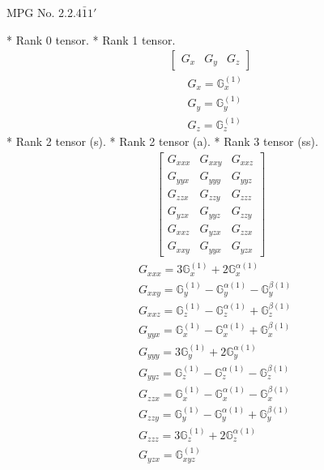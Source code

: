\documentclass[fleqn,8pt,landscape]{jsarticle}
\begin{document}
\setcounter{MaxMatrixCols}{32}

\renewcommand{\tablename}{Table~}
\renewcommand{\figurename}{Figure~}
\begin{center}
\LARGE
MPG No. 2.2.4\quad$\bar{1}1'$
\end{center}
* Rank 0 tensor.
* Rank 1 tensor.
\begin{align*}
\begin{bmatrix} G_{x} & G_{y} & G_{z} \end{bmatrix}
\end{align*}
\begin{align*}
& G_{x} = \mathbb{G}_{x}^{(1)} \\
& G_{y} = \mathbb{G}_{y}^{(1)} \\
& G_{z} = \mathbb{G}_{z}^{(1)}
\end{align*}
* Rank 2 tensor (s).
* Rank 2 tensor (a).
* Rank 3 tensor (ss).
\begin{align*}
\begin{bmatrix} G_{xxx} & G_{xxy} & G_{xxz} \\ G_{yyx} & G_{yyy} & G_{yyz} \\ G_{zzx} & G_{zzy} & G_{zzz} \\ G_{yzx} & G_{yyz} & G_{zzy} \\ G_{xxz} & G_{yzx} & G_{zzx} \\ G_{xxy} & G_{yyx} & G_{yzx} \end{bmatrix}
\end{align*}
\begin{align*}
& G_{xxx} = 3 \mathbb{G}_{x}^{(1)} + 2 \mathbb{G}_{x}^{\alpha(1)} \\
& G_{xxy} = \mathbb{G}_{y}^{(1)} - \mathbb{G}_{y}^{\alpha(1)} - \mathbb{G}_{y}^{\beta(1)} \\
& G_{xxz} = \mathbb{G}_{z}^{(1)} - \mathbb{G}_{z}^{\alpha(1)} + \mathbb{G}_{z}^{\beta(1)} \\
& G_{yyx} = \mathbb{G}_{x}^{(1)} - \mathbb{G}_{x}^{\alpha(1)} + \mathbb{G}_{x}^{\beta(1)} \\
& G_{yyy} = 3 \mathbb{G}_{y}^{(1)} + 2 \mathbb{G}_{y}^{\alpha(1)} \\
& G_{yyz} = \mathbb{G}_{z}^{(1)} - \mathbb{G}_{z}^{\alpha(1)} - \mathbb{G}_{z}^{\beta(1)} \\
& G_{zzx} = \mathbb{G}_{x}^{(1)} - \mathbb{G}_{x}^{\alpha(1)} - \mathbb{G}_{x}^{\beta(1)} \\
& G_{zzy} = \mathbb{G}_{y}^{(1)} - \mathbb{G}_{y}^{\alpha(1)} + \mathbb{G}_{y}^{\beta(1)} \\
& G_{zzz} = 3 \mathbb{G}_{z}^{(1)} + 2 \mathbb{G}_{z}^{\alpha(1)} \\
& G_{yzx} = \mathbb{G}_{xyz}^{(1)}
\end{align*}
\end{document}
